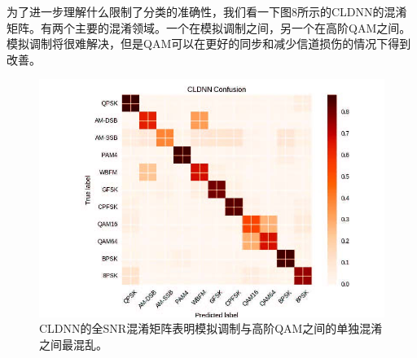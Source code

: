 为了进一步理解什么限制了分类的准确性，我们看一下图8所示的CLDNN的混淆矩阵。有两个主要的混淆领域。一个在模拟调制之间，另一个在高阶QAM之间。模拟调制将很难解决，但是QAM可以在更好的同步和减少信道损伤的情况下得到改善。\par

\begin{figure}[!h]
	\centering
	\includegraphics[scale=1]{figures/chapter_5/fig8}
	\caption{CLDNN的全SNR混淆矩阵表明模拟调制与高阶QAM之间的单独混淆之间最混乱。}
\end{figure}


